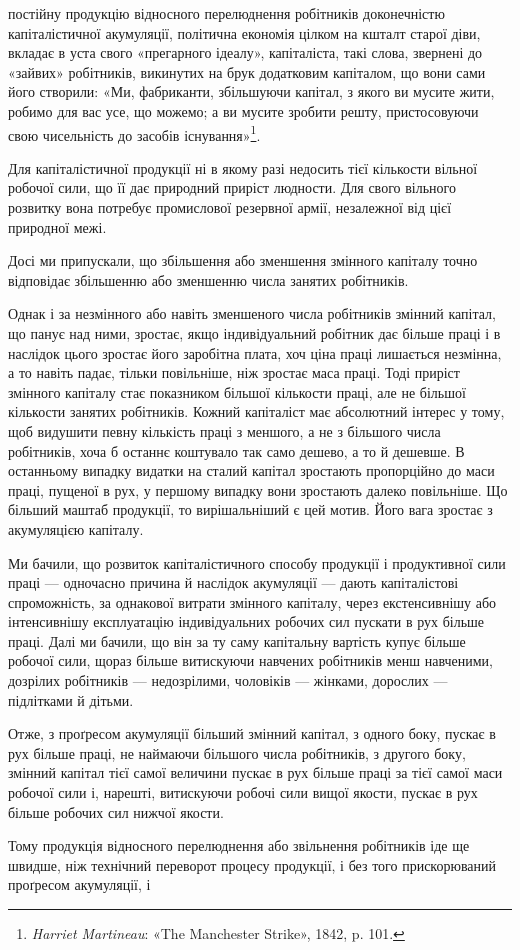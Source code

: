 постійну продукцію відносного перелюднення робітників доконечністю
капіталістичної акумуляції, політична економія цілком
на кшталт старої діви, вкладає в уста свого «прегарного
ідеалу», капіталіста, такі слова, звернені до «зайвих» робітників,
викинутих на брук додатковим капіталом, що вони сами його
створили: «Ми, фабриканти, збільшуючи капітал, з якого ви
мусите жити, робимо для вас усе, що можемо; а ви мусите зробити
решту, пристосовуючи свою чисельність до засобів існування»\footnote{
\emph{Harriet Martineau}: «The Manchester Strike», 1842, p. 101.
}.

Для капіталістичної продукції ні в якому разі недосить тієї
кількости вільної робочої сили, що її дає природний приріст
людности. Для свого вільного розвитку вона потребує промислової
резервної армії, незалежної від цієї природної межі.

Досі ми припускали, що збільшення або зменшення змінного
капіталу точно відповідає збільшенню або зменшенню числа
занятих робітників.

Однак і за незмінного або навіть зменшеного числа робітників
змінний капітал, що панує над ними, зростає, якщо індивідуальний
робітник дає більше праці і в наслідок цього зростає
його заробітна плата, хоч ціна праці лишається незмінна, а то
навіть падає, тільки повільніше, ніж зростає маса праці. Тоді
приріст змінного капіталу стає показником більшої кількости
праці, але не більшої кількости занятих робітників. Кожний
капіталіст має абсолютний інтерес у тому, щоб видушити певну
кількість праці з меншого, а не з більшого числа робітників,
хоча б останнє коштувало так само дешево, а то й дешевше.
В останньому випадку видатки на сталий капітал зростають
пропорційно до маси праці, пущеної в рух, у першому випадку
вони зростають далеко повільніше. Що більший маштаб продукції,
то вирішальніший є цей мотив. Його вага зростає з акумуляцією
капіталу.

Ми бачили, що розвиток капіталістичного способу продукції
і продуктивної сили праці — одночасно причина й наслідок
акумуляції — дають капіталістові спроможність, за однакової витрати
змінного капіталу, через екстенсивнішу або інтенсивнішу
експлуатацію індивідуальних робочих сил пускати в рух більше
праці. Далі ми бачили, що він за ту саму капітальну вартість
купує більше робочої сили, щораз більше витискуючи навчених
робітників менш навченими, дозрілих робітників — недозрілими,
чоловіків — жінками, дорослих — підлітками й дітьми.

Отже, з проґресом акумуляції більший змінний капітал, з
одного боку, пускає в рух більше праці, не наймаючи більшого
числа робітників, з другого боку, змінний капітал тієї самої
величини пускає в рух більше праці за тієї самої маси робочої
сили і, нарешті, витискуючи робочі сили вищої якости, пускає
в рух більше робочих сил нижчої якости.

Тому продукція відносного перелюднення або звільнення
робітників іде ще швидше, ніж технічний переворот процесу
продукції, і без того прискорюваний проґресом акумуляції, і
\parbreak{}  %
